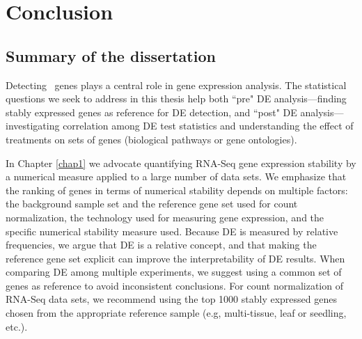 \pagebreak
\newpage

\section{Conclusion}\label{ch:conclusion}

\subsection{Summary of the dissertation}
Detecting \DED~genes plays a central role in gene expression analysis. The 
statistical questions we seek to address in this thesis help both ``pre" DE analysis---finding 
stably expressed genes as reference for DE detection, and ``post" DE analysis---investigating 
correlation among DE test statistics and understanding the effect of treatments on sets of 
genes (biological pathways or gene ontologies).

In Chapter \ref{chap1} we advocate quantifying RNA-Seq gene expression stability by a numerical 
measure applied to a large number of data sets. %
We emphasize that the ranking of genes in terms of numerical stability depends on multiple factors: 
the background sample set and the reference gene set used for count
normalization, the technology used for measuring gene expression, and the specific 
numerical stability measure used. Because DE is measured by relative frequencies, we argue that DE 
is a relative concept, and that making the reference gene set explicit can improve the 
interpretability of DE results.  When comparing DE among multiple experiments, 
we suggest using a common set of genes as reference to avoid inconsistent conclusions. For count 
normalization of RNA-Seq data sets,  we recommend  using the top 1000 stably expressed 
genes chosen from the appropriate reference sample (e.g, multi-tissue, leaf or seedling, etc.).

